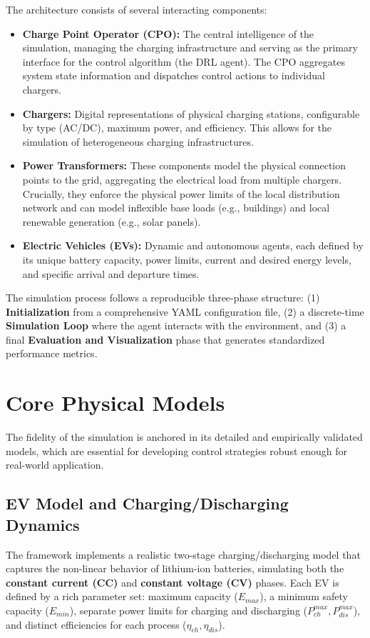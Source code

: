 The architecture consists of several interacting components:
\begin{itemize}
    \item \textbf{Charge Point Operator (CPO):} The central intelligence of the simulation, managing the charging infrastructure and serving as the primary interface for the control algorithm (the DRL agent). The CPO aggregates system state information and dispatches control actions to individual chargers.
    \item \textbf{Chargers:} Digital representations of physical charging stations, configurable by type (AC/DC), maximum power, and efficiency. This allows for the simulation of heterogeneous charging infrastructures.
    \item \textbf{Power Transformers:} These components model the physical connection points to the grid, aggregating the electrical load from multiple chargers. Crucially, they enforce the physical power limits of the local distribution network and can model inflexible base loads (e.g., buildings) and local renewable generation (e.g., solar panels).
    \item \textbf{Electric Vehicles (EVs):} Dynamic and autonomous agents, each defined by its unique battery capacity, power limits, current and desired energy levels, and specific arrival and departure times.
\end{itemize}

The simulation process follows a reproducible three-phase structure: (1) \textbf{Initialization} from a comprehensive YAML configuration file, (2) a discrete-time \textbf{Simulation Loop} where the agent interacts with the environment, and (3) a final \textbf{Evaluation and Visualization} phase that generates standardized performance metrics.

\section{Core Physical Models}
The fidelity of the simulation is anchored in its detailed and empirically validated models, which are essential for developing control strategies robust enough for real-world application.

\subsection{EV Model and Charging/Discharging Dynamics}
The framework implements a realistic two-stage charging/discharging model that captures the non-linear behavior of lithium-ion batteries, simulating both the \textbf{constant current (CC)} and \textbf{constant voltage (CV)} phases. Each EV is defined by a rich parameter set: maximum capacity ($E_{max}$), a minimum safety capacity ($E_{min}$), separate power limits for charging and discharging ($P_{ch}^{max}, P_{dis}^{max}$), and distinct efficiencies for each process ($\eta_{ch}, \eta_{dis}$).

